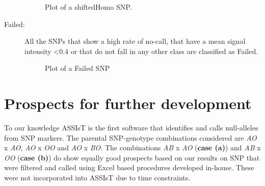 \documentclass[a4paper,11pt,english]{article}
\begin{document}
\begin{description}
\begin{figure}[H]
\caption{Plot of a shiftedHomo SNP.}\end{figure}

\item [Failed:] All the SNPs that show a high rate of no-call, that have a mean signal intensity
\textless{}0.4
or that do not fall in any other class are classified as Failed.
\begin{figure}[H]
\centering
\capstart

\caption{Plot of a Failed SNP}\end{figure}

\end{description}


\section{Prospects for further development}
\label{index:prospects-for-further-development}


To our knowledge ASSIsT is the first software that identifies and calls null-alleles from SNP
markers. The parental SNP-genotype combinations considered are \emph{AO} x \emph{AO}, 
\emph{AO} x \emph{OO} and \emph{AO} x \emph{BO}.
The combinations \emph{AB} x \emph{AO} (\textbf{case (a)}) and \emph{AB} x \emph{OO}
(\textbf{case (b)}) 
do show equally good prospects based
on our results on SNP that were filtered and called  using Excel based procedures  developed
in-house.
These were not incorporated into ASSIsT due to time constraints. 
\end{document}
